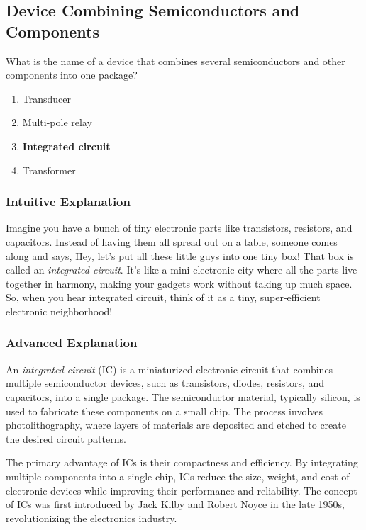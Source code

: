 \subsection{Device Combining Semiconductors and Components}
\label{T6D09}

\begin{tcolorbox}[colback=gray!10!white,colframe=black!75!black,title=T6D09]
What is the name of a device that combines several semiconductors and other components into one package?
\begin{enumerate}[label=\Alph*)]
    \item Transducer
    \item Multi-pole relay
    \item \textbf{Integrated circuit}
    \item Transformer
\end{enumerate}
\end{tcolorbox}

\subsubsection{Intuitive Explanation}
Imagine you have a bunch of tiny electronic parts like transistors, resistors, and capacitors. Instead of having them all spread out on a table, someone comes along and says, Hey, let's put all these little guys into one tiny box! That box is called an \textit{integrated circuit}. It’s like a mini electronic city where all the parts live together in harmony, making your gadgets work without taking up much space. So, when you hear integrated circuit, think of it as a tiny, super-efficient electronic neighborhood!

\subsubsection{Advanced Explanation}
An \textit{integrated circuit} (IC) is a miniaturized electronic circuit that combines multiple semiconductor devices, such as transistors, diodes, resistors, and capacitors, into a single package. The semiconductor material, typically silicon, is used to fabricate these components on a small chip. The process involves photolithography, where layers of materials are deposited and etched to create the desired circuit patterns.

The primary advantage of ICs is their compactness and efficiency. By integrating multiple components into a single chip, ICs reduce the size, weight, and cost of electronic devices while improving their performance and reliability. The concept of ICs was first introduced by Jack Kilby and Robert Noyce in the late 1950s, revolutionizing the electronics industry.

